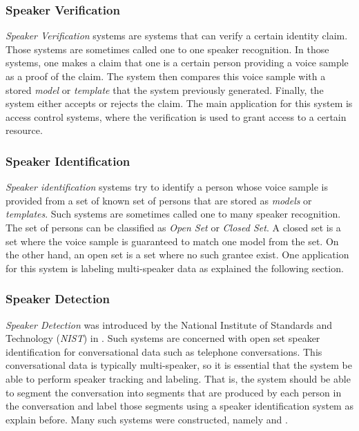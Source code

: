 \documentclass[twocolumn]{article}
\begin{document}
\subsubsection{Speaker Verification}

\emph{Speaker Verification} systems are systems that can verify a certain
identity claim. Those systems are sometimes called one to one speaker
recognition. In those systems, one makes a claim that one is a certain person
providing a voice sample as a proof of the claim. The system then compares this
voice sample with a stored \emph{model} or \emph{template} that the system
previously generated. Finally, the system either accepts or rejects the claim.
The main application for this system is access control systems, where the
verification is used to grant access to a certain resource.

\subsubsection{Speaker Identification}

\emph{Speaker identification} systems try to identify a person whose voice
sample is provided from a set of known set of persons that are stored as
\emph{models} or \emph{templates}.  Such systems are sometimes called one to
many speaker recognition. The set of persons can be classified as \emph{Open
Set} or \emph{Closed Set}. A closed set is a set where the voice sample is
guaranteed to match one model from the set. On the other hand, an open set is a
set where no such grantee exist. One application for this system is labeling
multi-speaker data as explained the following section.

\subsubsection{Speaker Detection}

\emph{Speaker Detection} was introduced by the National Institute of Standards
and Technology (\emph{NIST}) in \autocite{Przybocki1999}. Such systems are
concerned with open set speaker identification for conversational data such as
telephone conversations. This conversational data is typically multi-speaker,
so it is essential that the system be able to perform speaker tracking and
labeling. That is, the system should be able to segment the conversation into
segments that are produced by each person in the conversation and label those
segments using a speaker identification system as explain before. Many such
systems were constructed, namely \autocite{Wilcox1994} and
\autocite{Delacourt2000}.
\end{document}
